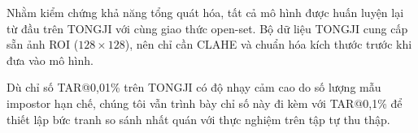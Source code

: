 \documentclass[12pt,a4paper]{article}
\begin{document}
Nhằm kiểm chứng khả năng tổng quát hóa, tất cả mô hình được huấn luyện lại từ đầu trên TONGJI với cùng giao thức open-set. Bộ dữ liệu TONGJI cung cấp sẵn ảnh ROI ($128 \times 128$), nên chỉ cần CLAHE và chuẩn hóa kích thước trước khi đưa vào mô hình.

Dù chỉ số TAR@0,01\% trên TONGJI có độ nhạy cảm cao do số lượng mẫu impostor hạn chế, chúng tôi vẫn trình bày chỉ số này đi kèm với TAR@0,1\% để thiết lập bức tranh so sánh nhất quán với thực nghiệm trên tập tự thu thập.

\begin{table}[H]
\caption{So sánh hiệu năng trên bộ dữ liệu TONGJI (giao thức Open-Set, 360 định danh kiểm thử). $\dagger$: mã nguồn công khai, $\ddagger$: tự cài đặt lại. ``---'': đang bổ sung.}
\begin{center}
\label{tab:tongji_results}
\end{center}
\end{table}
\end{document}
